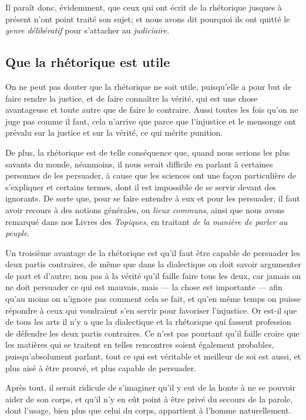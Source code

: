 \medbreak

Il paraît donc, évidemment, que ceux qui ont écrit de la rhétorique jusques à présent n'ont point traité son sujet; et nous avons dit pourquoi ils ont
quitté le \emph{genre délibératif} pour s'attacher au \emph{judiciaire}.

\subsection{Que la rhétorique est utile}

On ne peut pas douter que la rhétorique ne soit utile, puisqu'elle a pour but de faire rendre la justice, et de faire connaître la vérité, qui est
une chose avantageuse et toute autre que de faire le contraire. Aussi toutes les fois qu'on ne juge pas comme il faut, cela n'arrive que parce que
l'injustice et le mensonge ont prévalu sur la justice et sur la vérité, ce qui mérite punition. 

De plus, la rhétorique est de telle conséquence que, quand nous serions les plus savants du monde, néanmoins, il nous serait difficile en parlant à
certaines personnes de les persuader, à cause que les sciences ont une façon particulière de s'expliquer et certains termes, dont il est impossible de
se servir devant des ignorants. De sorte que, pour se faire entendre à eux et pour les persuader, il faut avoir recours à des notions générales, ou
\emph{lieux communs}, ainsi que nous avons remarqué dans nos Livres des \emph{Topiques}, en traitant \emph{de la manière de parler au peuple}.

Un troisième avantage de la rhétorique est qu'il faut être capable de persuader les deux partis contraires, de même que dans la dialectique on doit
savoir argumenter de part et d'autre; non pas à la vérité qu'il faille faire tous les deux, car jamais on ne doit persuader ce qui est mauvais, mais --- la
chose est importante --- afin qu'au moins on n'ignore pas comment cela se fait, et qu'en même temps on puisse répondre à ceux qui voudraient s'en servir
pour favoriser l'injustice. Or est-il que de tous les arts il n'y a que la dialectique et la rhétorique qui fassent profession de défendre les deux partis
contraires. Ce n'est pas pourtant qu'il faille croire que les matières qui se traitent en telles rencontres soient également probables, puisqu'absolument
parlant, tout ce qui est véritable et meilleur de soi est aussi, et plus aisé à être prouvé, et plus capable de persuader.

Après tout, il serait ridicule de s'imaginer qu'il y eut de la honte à ne se pouvoir aider de son corps, et qu'il n'y en eût point à être privé du secours
de la parole, dont l'usage, bien plus que celui du corps, appartient à l'homme naturellement. 

